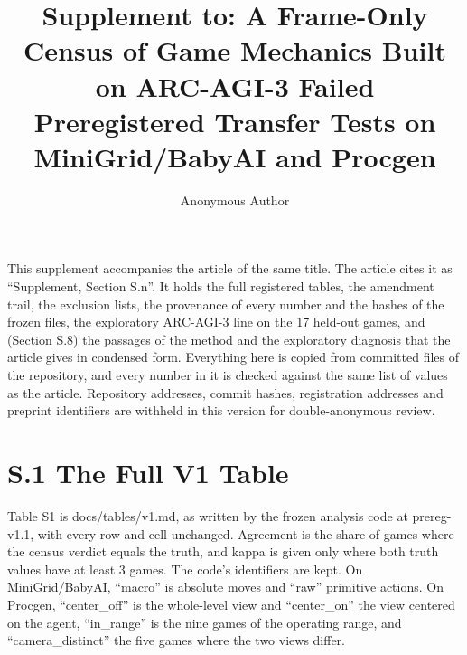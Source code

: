 \documentclass[journal,onecolumn]{IEEEtran}
\begin{document}
\sloppy
\title{Supplement to: A Frame-Only Census of Game Mechanics Built on
ARC-AGI-3 Failed Preregistered Transfer Tests on MiniGrid/BabyAI and
Procgen}
\author{Anonymous Author}
\maketitle
This supplement accompanies the article of the same title. The article
cites it as ``Supplement, Section S.n''. It holds the full registered
tables, the amendment trail, the exclusion lists, the provenance of
every number and the hashes of the frozen files, the exploratory
ARC-AGI-3 line on the 17 held-out games, and (Section S.8) the passages
of the method and the exploratory diagnosis that the article gives in
condensed form. Everything here is copied from committed files of the
repository, and every number in it is checked against the same list of
values as the article. Repository addresses, commit hashes, registration
addresses and preprint identifiers are withheld in this version for
double-anonymous review.

\section*{S.1 The Full V1 Table}\label{s.1-the-full-v1-table}

Table S1 is docs/tables/v1.md, as written by the frozen analysis code at
prereg-v1.1, with every row and cell unchanged. Agreement is the share
of games where the census verdict equals the truth, and kappa is given
only where both truth values have at least 3 games. The code's
identifiers are kept. On MiniGrid/BabyAI, ``macro'' is absolute moves
and ``raw'' primitive actions. On Procgen, ``center\_off'' is the
whole-level view and ``center\_on'' the view centered on the agent,
``in\_range'' is the nine games of the operating range, and
``camera\_distinct'' the five games where the two views differ.
\end{document}
